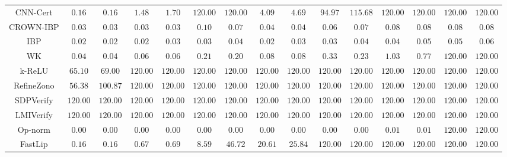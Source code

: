 \begin{table*}
{\begin{tabular}{c|c|c|c|c|c|c|c|c|c|c|c|c|c|c}
     CNN-Cert &        $0.16$ &        $0.16$ &        $1.48$ &        $1.70$ &      $120.00$ &      $120.00$ &        $4.09$ &        $4.69$ &       $94.97$ &      $115.68$ &      $120.00$ &      $120.00$ &      $120.00$ &      $120.00$ \\
    CROWN-IBP &        $0.03$ &        $0.03$ &        $0.03$ &        $0.03$ &        $0.10$ &        $0.07$ &        $0.04$ &        $0.04$ &        $0.06$ &        $0.07$ &        $0.08$ &        $0.08$ &        $0.08$ &        $0.08$ \\
          IBP &        $0.02$ &        $0.02$ &        $0.02$ &        $0.03$ &        $0.03$ &        $0.04$ &        $0.02$ &        $0.03$ &        $0.03$ &        $0.04$ &        $0.04$ &        $0.05$ &        $0.05$ &        $0.06$ \\
           WK &        $0.04$ &        $0.04$ &        $0.06$ &        $0.06$ &        $0.21$ &        $0.20$ &        $0.08$ &        $0.08$ &        $0.33$ &        $0.23$ &        $1.03$ &        $0.77$ &      $120.00$ &      $120.00$ \\
       k-ReLU &       $65.10$ &       $69.00$ &      $120.00$ &      $120.00$ &      $120.00$ &      $120.00$ &      $120.00$ &      $120.00$ &      $120.00$ &      $120.00$ &      $120.00$ &      $120.00$ &      $120.00$ &      $120.00$ \\
   RefineZono &       $56.38$ &      $100.87$ &      $120.00$ &      $120.00$ &      $120.00$ &      $120.00$ &      $120.00$ &      $120.00$ &      $120.00$ &      $120.00$ &      $120.00$ &      $120.00$ &      $120.00$ &      $120.00$ \\
    SDPVerify &      $120.00$ &      $120.00$ &      $120.00$ &      $120.00$ &      $120.00$ &      $120.00$ &      $120.00$ &      $120.00$ &      $120.00$ &      $120.00$ &      $120.00$ &      $120.00$ &      $120.00$ &      $120.00$ \\
    LMIVerify &      $120.00$ &      $120.00$ &      $120.00$ &      $120.00$ &      $120.00$ &      $120.00$ &      $120.00$ &      $120.00$ &      $120.00$ &      $120.00$ &      $120.00$ &      $120.00$ &      $120.00$ &      $120.00$ \\
      Op-norm &        $0.00$ &        $0.00$ &        $0.00$ &        $0.00$ &        $0.00$ &        $0.00$ &        $0.00$ &        $0.00$ &        $0.00$ &        $0.00$ &        $0.01$ &        $0.01$ &      $120.00$ &      $120.00$ \\
      FastLip &        $0.16$ &        $0.16$ &        $0.67$ &        $0.69$ &        $8.59$ &       $46.72$ &       $20.61$ &       $25.84$ &      $120.00$ &      $120.00$ &      $120.00$ &      $120.00$ &      $120.00$ &      $120.00$ \\

\end{tabular}}
\end{table*}
